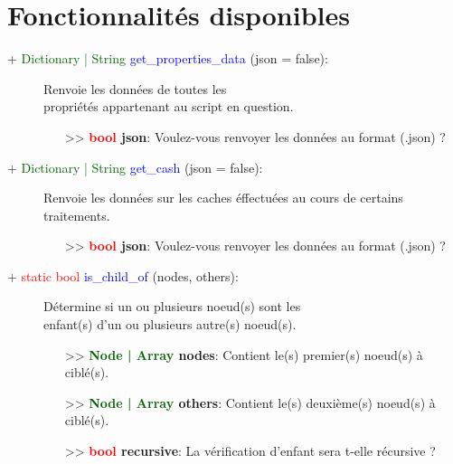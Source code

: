 \documentclass[a4paper, 11pt]{article}
\begin{document}
	\section{Fonctionnalités disponibles}
	\begin{description}
		\item [+ \textcolor{darkgreen}{Dictionary | String} \textcolor{blue}{get\_properties\_data} (json = 
		false):] Renvoie les données de toutes les \\propriétés appartenant au script en question.
		\begin{itemize}
			\item [>> \textbf{\textcolor{red}{bool} json}:] Voulez-vous renvoyer les données au format 
			(.json) ?\\
		\end{itemize}
	\end{description}
	\begin{description}
		\item [+ \textcolor{darkgreen}{Dictionary | String} \textcolor{blue}{get\_cash} (json = false):] 
		Renvoie les données sur les caches éffectuées au cours de certains traitements.
		\begin{itemize}
			\item [>> \textbf{\textcolor{red}{bool} json}:] Voulez-vous renvoyer les données au format 
			(.json) ?\\
		\end{itemize}
	\end{description}
	\begin{description}
		\item [+ \textcolor{red}{static bool} \textcolor{blue}{is\_child\_of} (nodes, others):] Détermine
		si un ou plusieurs noeud(s) sont les \\enfant(s) d'un ou plusieurs autre(s) noeud(s).
		\begin{itemize}
			\item [>> \textbf{\textcolor{darkgreen}{Node | Array} nodes}:] Contient le(s) premier(s)
			noeud(s) à ciblé(s).
			\item [>> \textbf{\textcolor{darkgreen}{Node | Array} others}:] Contient le(s) deuxième(s)
			noeud(s) à ciblé(s).
			\item [>> \textbf{\textcolor{red}{bool} recursive}:] La vérification d'enfant sera t-elle
			récursive ?\\
		\end{itemize}
	\end{description}
\end{document}
